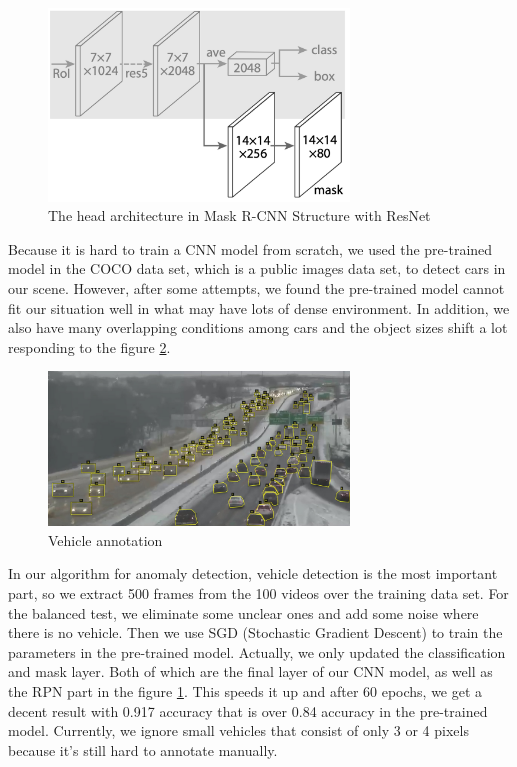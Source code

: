 \documentclass[10pt,twocolumn,letterpaper]{article}
\begin{document}
	\begin{figure}  
    \includegraphics[width=8cm]{images/maskrcnn.png}
    \caption{The head architecture in Mask R-CNN Structure with ResNet}
    \label{maskrcnn}
	\end{figure}

Because it is hard to train a CNN model from scratch, we used the pre-trained model in the COCO data set\cite{DBLP:journals/corr/LinMBHPRDZ14}, which is a public images data set, to detect cars in our scene. However, after some attempts, we found the pre-trained model cannot fit our situation well in what may have lots of dense environment. In addition, we also have many overlapping conditions among cars and the object sizes shift a lot responding to the figure \ref{annotated_car}. 
	
	\begin{figure}  
    \includegraphics[width=8cm]{images/annotated_car.jpg}
    \caption{Vehicle annotation}
    \label{annotated_car}
	\end{figure}
	
In our algorithm for anomaly detection, vehicle detection is the most important part, so we extract 500 frames from the 100 videos over the training data set. For the balanced test, we eliminate some unclear ones and add some noise where there is no vehicle. Then we use SGD (Stochastic Gradient Descent) to train the parameters in the pre-trained model. Actually, we only updated the classification and mask layer. Both of which are the final layer of our CNN model, as well as the RPN part in the figure \ref{maskrcnn}. This speeds it up and after 60 epochs, we get a decent result with 0.917 accuracy that is over 0.84 accuracy in the pre-trained model. Currently, we ignore small vehicles that consist of only 3 or 4 pixels because it's still hard to annotate manually.
\end{document}
